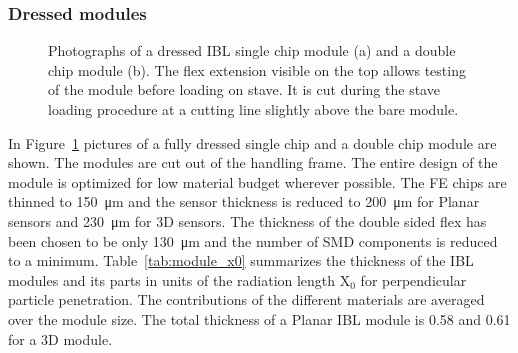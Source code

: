 \subsubsection{Dressed modules}
\label{sec:dressed_modules}
\begin{figure}
	\centering

  \caption{Photographs of a dressed IBL single chip module (a) and a double chip module (b). The flex extension visible on the top allows testing of the module before loading on stave. It is cut during the stave loading procedure at a cutting line slightly above the bare module.}
	\label{fig:module_pictures}
\end{figure}
In Figure~\ref{fig:module_pictures} pictures of a fully dressed single chip and a double chip module are shown. The modules are cut out of the handling frame.
The entire design of the module is optimized for low material budget wherever possible. The FE chips are thinned to \SI{150}{\micro\meter} and the sensor thickness is reduced to \SI{200}{\micro\meter} for Planar sensors and \SI{230}{\micro\meter} for 3D sensors. The thickness of the double sided flex has been chosen to be only \SI{130}{\micro\meter} and the number of SMD components is reduced to a minimum. Table~\ref{tab:module_x0} summarizes the thickness of the IBL modules and its parts in units of the radiation length X$_0$ for perpendicular particle penetration. The contributions of the different materials are averaged over the module size. The total thickness of a Planar IBL module is \SI{0.58}{\xzero} and \SI{0.61}{\xzero} for a 3D module. 
